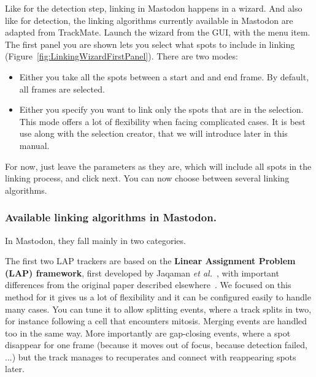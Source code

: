 Like for the detection step, linking in Mastodon happens in a wizard.
And also like for detection, the linking algorithms currently available in Mastodon are adapted from TrackMate. 
Launch the wizard from the GUI, with the  menu item. 
The first panel you are shown lets you select what spots to include in linking (Figure~\ref{fig:LinkingWizardFirstPanel}). 
There are two modes:
\begin{itemize}
    \item Either you take all the spots between a start and and end frame. By default, all frames are selected.
    \item Either you specify you want to link only the spots that are in the selection. 
    This mode offers a lot of flexibility when facing complicated cases. 
    It is best use along with the selection creator, that we will introduce later in this manual.
\end{itemize}
For now, just leave the parameters as they are, which will include all spots in the linking process, and click next.
You can now choose between several linking algorithms. 

\subsubsection{Available linking algorithms in Mastodon.}

In Mastodon, they fall mainly in two categories.

The first two LAP trackers are based on the \textbf{Linear Assignment Problem (LAP) framework}, first developed by Jaqaman \textit{et al.}~\cite{Jaqaman2008}, with important differences from the original paper described elsewhere~\cite{TrackMate}. 
We focused on this method for it gives us a lot of flexibility and it can be configured easily to handle many cases. 
You can tune it to allow splitting events, where a track splits in two, for instance following a cell that encounters mitosis. 
Merging events are handled too in the same way. More importantly are gap-closing events, where a spot disappear for one frame (because it moves out of focus, because detection failed, ...) but the track manages to recuperates and connect with reappearing spots later.

